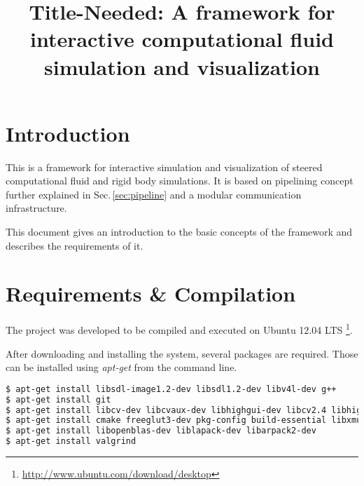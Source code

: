 \documentclass[11pt,a4paper]{article}
\begin{document}

\title{Title-Needed: A framework for interactive computational fluid simulation and
visualization}

\maketitle



\section{Introduction}

This is a framework for interactive simulation and visualization of
steered computational fluid and rigid body simulations.
It is based on pipelining concept further explained in Sec.\,\ref{sec:pipeline}
and a modular communication infrastructure.

This document gives an introduction to the basic concepts of the framework and
describes the requirements of it.



\section{Requirements \& Compilation}

The project was developed to be compiled and executed on Ubuntu 12.04 LTS
\footnote{\url{http://www.ubuntu.com/download/desktop}}.

After downloading and installing the system, several packages are required.
Those can be installed using \textit{apt-get} from the command line.

\begin{lstlisting}[language=sh]
$ apt-get install libsdl-image1.2-dev libsdl1.2-dev libv4l-dev g++
$ apt-get install git
$ apt-get install libcv-dev libcvaux-dev libhighgui-dev libcv2.4 libhighgui2.4 libcvaux2.4 opencv-doc
$ apt-get install cmake freeglut3-dev pkg-config build-essential libxmu-dev libxi-dev libusb-1.0-0-dev doxygen graphviz mono-complete git-core
$ apt-get install libopenblas-dev liblapack-dev libarpack2-dev
$ apt-get install valgrind
\end{lstlisting}
\end{document}
